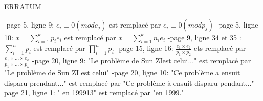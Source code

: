 \documentclass[a4paper, 11pt]{article}
\begin{document}
\begin{center}
    ERRATUM
\end{center}

\vspace*{3cm}
\setlength{\parindent}{0pt}
    -page 5, ligne 9: $e_i\equiv 0(mod e_j)$ est remplacé par $e_i \equiv 0(mod p_j)$ \newline
    \newline
    -page 5, ligne 10: $x=\sum_{i = 1}^{k} p_i e_i $ est remplacé par $x=\sum_{i=1}^{k} n_i e_i$ \newline
    \newline
    -page 9, ligne 34 et 35 : $\sum_{i=1}^{n} p_i$ est remplacé par $\prod_{i=1}^{n} p_i$ \newline
    \newline
    -page 15, ligne 16: $ \frac{e_1 \times e_2}{p_1 \times p_2} $ ets remplacé par $\frac{e_1 \times ... \times e_k}{p_1\times ...\times p_k}$ \newline
    \newline
    -page 20, ligne 9: "Le problème de Sun ZIest celui..." est remplacé par "Le problème de Sun ZI est celui" \newline
    \newline
    -page 20, ligne 10: "Ce problème a ensuit disparu prendant..." est remplacé par "Ce problème à ensuit disparu pendant..." \newline
    \newline
    -page 21, ligne 1: " en 199913" est remplacé par "en 1999."
\end{document}
